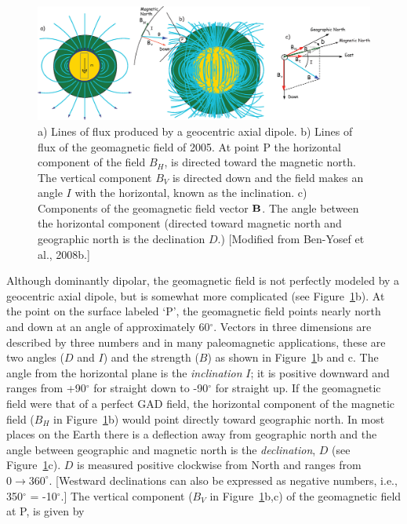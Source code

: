 \begin{figure}[htb]
\centering  \includegraphics[width=14.5 cm]{EPSfiles/components.eps}
\caption{a) Lines of flux produced by  a geocentric axial dipole.  b) Lines of flux  of the geomagnetic field of 2005.   At point P the horizontal component of the  field $B_H$, is directed toward the magnetic north.  The vertical component $B_V$ is directed down and the field makes an angle $I$ with the horizontal, known as the
%
inclination.  c) Components of the geomagnetic field vector $\hbox{\bf B}$.  The angle between the horizontal component (directed toward magnetic north and geographic north is the 
declination $D$.) [Modified from Ben-Yosef et al., 2008b.] 
}
\label{fig:coord}
\end{figure}
\nocite{benyosef08b}
%

Although dominantly dipolar, the  geomagnetic field is not perfectly modeled by a geocentric axial dipole, but is somewhat more complicated (see Figure~\ref{fig:coord}b).  At the point on the surface labeled `P', the geomagnetic field points nearly north and down at an angle of approximately 60$^{\circ}$.   
Vectors in three dimensions are described by three numbers and in many paleomagnetic applications, these are two angles ($D$ and $I$) and the  strength ($B$)  as shown in  Figure~\ref{fig:coord}b and c.  The angle from the horizontal plane  is  the
%
 {\it inclination} $I$; it  is positive downward and ranges from +90$^{\circ}$ for straight down to -90$^{\circ}$ for straight up.   If the geomagnetic field were that of a perfect GAD field, the horizontal component of the magnetic field ($B_H$ in Figure~\ref{fig:coord}b)  would point directly toward geographic  north.  In most places on the Earth there is a deflection away from geographic north and  the angle between geographic and magnetic north is the
%
 {\it declination}, $D$ (see Figure~\ref{fig:coord}c).  $D$ is measured positive clockwise from  North  and  ranges from $0 \rightarrow 360^\circ$.   [Westward declinations can also be expressed as negative numbers, i.e., 350$^{\circ}$ = -10$^{\circ}$.]   The vertical component ($B_V$  in Figure~\ref{fig:coord}b,c) of the geomagnetic field at P, is given by 

